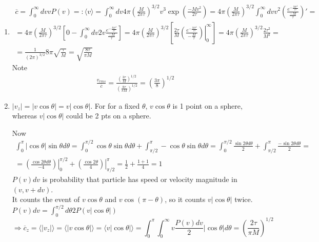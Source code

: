 \begin{enumerate}
\[
v_{mp} = \sqrt{ \frac{2\tau}{M} } < \sqrt{ \frac{3\tau}{M} } = v_{rms}
\]
  \item[(c)] \[
\begin{gathered}
  \overline{c} = \int_0^{\infty} dv v P(v) =: \langle v \rangle = \int_0^{\infty}dv 4\pi \left( \frac{M}{ 2\pi \tau} \right)^{3/2} v^3 \exp{ \left( \frac{-Mv^2}{2\tau} \right) } = 4 \pi \left( \frac{M}{2\pi \tau} \right)^{3/2} \int_0^{\infty}dv v^2 \left( \frac{ e^{ -\frac{Mv^2}{2\tau} } }{ \frac{-M}{\tau} } \right)' = \\
  = 4\pi \left( \frac{M}{2\pi \tau} \right)^{3/2} \left[ 0 - \int_0^{\infty} dv 2v \frac{e^{ -\frac{Mv^2}{2\tau } } }{ \frac{-M}{\tau} } \right] = 4\pi \left( \frac{M}{2\pi \tau} \right)^{3/2} \left[ \frac{2\tau}{M} \left. \left( \frac{e^{-\frac{Mv^2}{ 2\tau } } }{ -\frac{M}{\tau} } \right) \right|_0^{\infty} \right] = 4 \pi \left( \frac{M}{2\pi \tau} \right)^{3/2} \frac{2\tau^2}{M^2} = \\
   = \frac{1}{(2\pi )^{3/2} } 8 \pi \sqrt{ \frac{\tau}{M}} = \boxed{ \sqrt{ \frac{8\tau}{\pi M} } }
\end{gathered}
\]
Note
\[
\begin{gathered}
  \frac{v_{rms}}{ \overline{c}} = \frac{ \left( \frac{3\tau}{M} \right)^{1/2} }{ \left( \frac{8\tau}{\pi M} \right)^{1/2} } = \left( \frac{3\pi }{8} \right)^{1/2}
\end{gathered}
\]
\item[(d)] $|v_z| = |v\cos{\theta} | = v|\cos{\theta}|$.  For for a fixed $\theta$, $v\cos{\theta}$ is 1 point on a sphere, whereas $v|\cos{\theta}|$ could be 2 pts on a sphere.  

Now
\[
\begin{gathered}
\int_0^{\pi} |\cos{\theta}| \sin{\theta}d\theta = \int_0^{\pi/2} \cos{\theta} \sin{\theta} d\theta + \int_{\pi/2}^{\pi} - \cos{\theta} \sin{\theta} d\theta = \int_0^{\pi/2} \frac{\sin{2\theta} d\theta}{ 2} + \int_{\pi/2}^{\pi} \frac{ - \sin{2\theta} d\theta}{2} = \\
= \left. \left( \frac{ \cos{2\theta} d\theta}{-4} \right) \right|_0^{\pi/2} + \left. \left( \frac{ \cos{2\theta} }{ 4} \right) \right|_{\pi/2}^{\pi} = \frac{1}{2} + \frac{1 + 1 }{4} = 1 
\end{gathered}
\]
$P(v)dv$ is probability that particle has speed or velocity magnitude in $(v,v+dv)$.  \\
It counts the event of $v\cos{\theta}$ and $v\cos{(\pi-\theta)}$, so it counts $v|\cos{\theta}|$ twice.  $P(v)dv = \int_0^{\pi/2} d\theta 2 P(v|\cos{\theta}|) $
\[
\Longrightarrow \overline{c}_z = \langle |v_z| \rangle = \langle |v\cos{\theta}| \rangle = \langle v |\cos{\theta} | \rangle = \int_0^{\pi} \int_0^{\infty} v \frac{ P(v) dv}{2} |\cos{\theta}| d\theta = \left( \frac{2\tau}{\pi M } \right)^{1/2}
\]

\end{enumerate}



